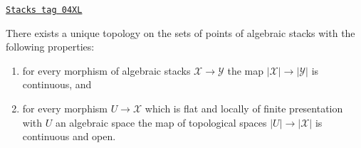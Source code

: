 \begin{lemma}
\label{stacks-properties-lemma-topology-points}
\href{https://stacks.math.columbia.edu/tag/04XL}{\texttt{Stacks tag 04XL}}

There exists a unique topology on the sets of points
of algebraic stacks with the following properties:
\begin{enumerate}
\item for every morphism of algebraic stacks $\mathcal{X} \to \mathcal{Y}$
the map $|\mathcal{X}| \to |\mathcal{Y}|$ is continuous, and
\item for every morphism $U \to \mathcal{X}$ which is flat and locally
of finite presentation with $U$ an algebraic space
the map of topological spaces $|U| \to |\mathcal{X}|$ is continuous and open.
\end{enumerate}
\end{lemma}

